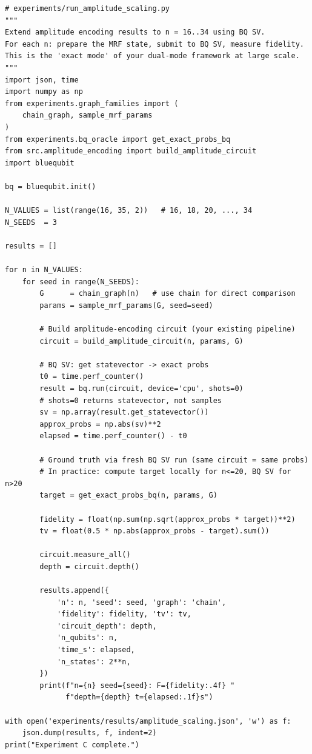 \documentclass[11pt]{article}
\begin{document}
\begin{lstlisting}
# experiments/run_amplitude_scaling.py
"""
Extend amplitude encoding results to n = 16..34 using BQ SV.
For each n: prepare the MRF state, submit to BQ SV, measure fidelity.
This is the 'exact mode' of your dual-mode framework at large scale.
"""
import json, time
import numpy as np
from experiments.graph_families import (
    chain_graph, sample_mrf_params
)
from experiments.bq_oracle import get_exact_probs_bq
from src.amplitude_encoding import build_amplitude_circuit
import bluequbit

bq = bluequbit.init()

N_VALUES = list(range(16, 35, 2))   # 16, 18, 20, ..., 34
N_SEEDS  = 3

results = []

for n in N_VALUES:
    for seed in range(N_SEEDS):
        G      = chain_graph(n)   # use chain for direct comparison
        params = sample_mrf_params(G, seed=seed)

        # Build amplitude-encoding circuit (your existing pipeline)
        circuit = build_amplitude_circuit(n, params, G)

        # BQ SV: get statevector -> exact probs
        t0 = time.perf_counter()
        result = bq.run(circuit, device='cpu', shots=0)
        # shots=0 returns statevector, not samples
        sv = np.array(result.get_statevector())
        approx_probs = np.abs(sv)**2
        elapsed = time.perf_counter() - t0

        # Ground truth via fresh BQ SV run (same circuit = same probs)
        # In practice: compute target locally for n<=20, BQ SV for n>20
        target = get_exact_probs_bq(n, params, G)

        fidelity = float(np.sum(np.sqrt(approx_probs * target))**2)
        tv = float(0.5 * np.abs(approx_probs - target).sum())

        circuit.measure_all()
        depth = circuit.depth()

        results.append({
            'n': n, 'seed': seed, 'graph': 'chain',
            'fidelity': fidelity, 'tv': tv,
            'circuit_depth': depth,
            'n_qubits': n,
            'time_s': elapsed,
            'n_states': 2**n,
        })
        print(f"n={n} seed={seed}: F={fidelity:.4f} "
              f"depth={depth} t={elapsed:.1f}s")

with open('experiments/results/amplitude_scaling.json', 'w') as f:
    json.dump(results, f, indent=2)
print("Experiment C complete.")
\end{lstlisting}
\end{document}

